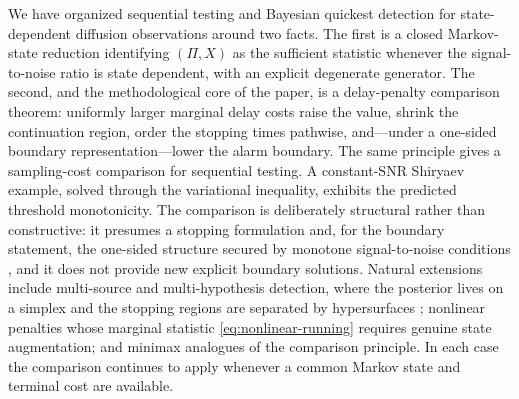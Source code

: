 \documentclass[pdflatex,sn-mathphys-num]{sn-jnl}
\theoremstyle{plain}
\theoremstyle{definition}
\newcommand{\post}{\Pi}
\begin{document}
We have organized sequential testing and Bayesian quickest detection for
state-dependent diffusion observations around two facts. The first is a closed
Markov-state reduction identifying $(\post,X)$ as the sufficient statistic
whenever the signal-to-noise ratio is state dependent, with an explicit degenerate
generator. The second, and the methodological core of the paper, is a
delay-penalty comparison theorem: uniformly larger marginal delay costs raise the
value, shrink the continuation region, order the stopping times pathwise, and---under
a one-sided boundary representation---lower the alarm boundary. The same principle
gives a sampling-cost comparison for sequential testing. A constant-SNR Shiryaev
example, solved through the variational inequality, exhibits the predicted
threshold monotonicity. The comparison is deliberately structural rather than
constructive: it presumes a stopping formulation and, for the boundary statement,
the one-sided structure secured by monotone signal-to-noise conditions
\citep{ernst2024gapeev}, and it does not provide new explicit boundary solutions.
Natural extensions include multi-source and multi-hypothesis detection, where the
posterior lives on a simplex and the stopping regions are separated by
hypersurfaces \citep{dayanik2008multisource}; nonlinear penalties whose marginal
statistic \eqref{eq:nonlinear-running} requires genuine state augmentation; and
minimax analogues of the comparison principle. In each case the comparison
continues to apply whenever a common Markov state and terminal cost are available.


\end{document}
